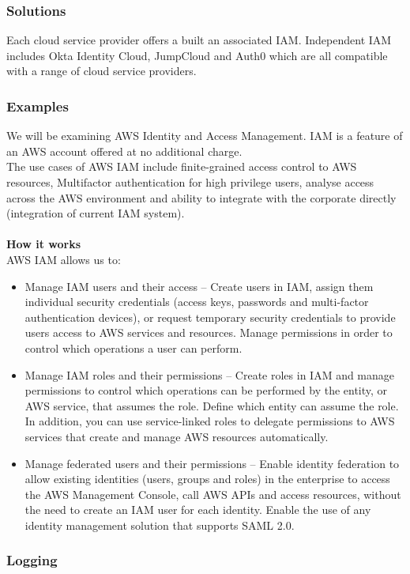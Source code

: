 \documentclass[10pt]{article}
\begin{document}
\subsubsection{Solutions}
Each cloud service provider offers a built an associated IAM. Independent IAM includes Okta Identity Cloud, JumpCloud and Auth0 which are all compatible with a range of cloud service providers.
\subsubsection{Examples}
We will be examining AWS Identity and Access Management. IAM is a feature of an AWS account offered at no additional charge. 
\\
The use cases of AWS IAM include finite-grained access control to AWS resources, Multifactor authentication for high privilege users, analyse access across the AWS environment and ability to integrate with the corporate directly (integration of current IAM system). 
\\\\\textbf{How it works} \\
AWS IAM allows us to:
\begin{itemize}
    \item Manage IAM users and their access –  Create users in IAM, assign them individual security credentials (access keys, passwords and multi-factor authentication devices), or request temporary security credentials to provide users access to AWS services and resources. Manage permissions in order to control which operations a user can perform.
    \item Manage IAM roles and their permissions – Create roles in IAM and manage permissions to control which operations can be performed by the entity, or AWS service, that assumes the role. Define which entity can assume the role. In addition, you can use service-linked roles to delegate permissions to AWS services that create and manage AWS resources automatically.
    \item Manage federated users and their permissions – Enable identity federation to allow existing identities (users, groups and roles) in the enterprise to access the AWS Management Console, call AWS APIs and access resources, without the need to create an IAM user for each identity. Enable the use of any identity management solution that supports SAML 2.0.
\end{itemize}
\subsubsection{Logging}
\end{document}
